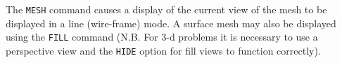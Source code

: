 \headb

The {\tt MESH} command causes a display of the current view of the 
mesh to be displayed in a line (wire-frame) mode. A surface mesh may also
be displayed using the {\tt FILL} command (N.B.  For 3-d problems it is
necessary to use a perspective view and the {\tt HIDE} option for fill
views to function correctly).
\vfill
\eject
